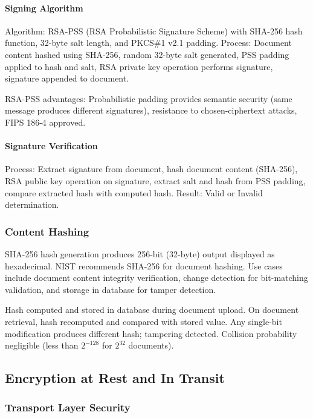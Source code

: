 \documentclass[12pt,oneside,openright,a4paper]{cpe-english-project}
\begin{document}
\paragraph{Signing Algorithm}

Algorithm: RSA-PSS (RSA Probabilistic Signature Scheme) with SHA-256 hash function, 32-byte salt length, and PKCS\#1 v2.1 padding. Process: Document content hashed using SHA-256, random 32-byte salt generated, PSS padding applied to hash and salt, RSA private key operation performs signature, signature appended to document.

RSA-PSS advantages: Probabilistic padding provides semantic security (same message produces different signatures), resistance to chosen-ciphertext attacks, FIPS 186-4 approved.

\paragraph{Signature Verification}

Process: Extract signature from document, hash document content (SHA-256), RSA public key operation on signature, extract salt and hash from PSS padding, compare extracted hash with computed hash. Result: Valid or Invalid determination.

\subsubsection{Content Hashing}

SHA-256 hash generation produces 256-bit (32-byte) output displayed as hexadecimal. NIST recommends SHA-256 for document hashing. Use cases include document content integrity verification, change detection for bit-matching validation, and storage in database for tamper detection.

Hash computed and stored in database during document upload. On document retrieval, hash recomputed and compared with stored value. Any single-bit modification produces different hash; tampering detected. Collision probability negligible (less than $2^{-128}$ for $2^{32}$ documents).

\vspace{1em}

\subsection{Encryption at Rest and In Transit}

\subsubsection{Transport Layer Security}
\end{document}
